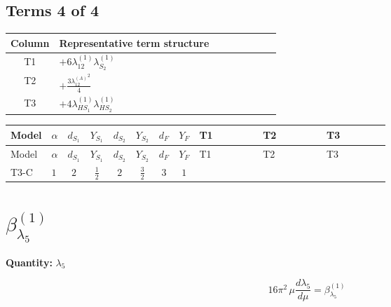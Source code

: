 \documentclass[8pt]{article}
\begin{document}
\begin{landscape}
\subsection*{Terms 4 of 4}
\begin{center}
\begin{tabular}{@{}c >{\raggedright\arraybackslash}p{0.82\linewidth}@{}}
\toprule
Column & Representative term structure \\
\midrule
T1 & \(\displaystyle +6 {\lambda_{12}^{(1)}} {\lambda_{S_2}^{(1)}}\) \\
\midrule
T2 & \(\displaystyle +\frac{3 {\lambda_{12}^{(A)}}^2}{4}\) \\
\midrule
T3 & \(\displaystyle +4 {\lambda_{HS_1}^{(1)}} {\lambda_{HS_2}^{(1)}}\) \\
\midrule
\bottomrule
\end{tabular}
\end{center}
\smallskip
\tiny
\begin{longtable}{@{}llcccccc >{\raggedright\arraybackslash}p{0.21\linewidth} >{\raggedright\arraybackslash}p{0.21\linewidth} >{\raggedright\arraybackslash}p{0.21\linewidth}@{}}
\toprule
Model & $\alpha$ & $d_{S_1}$ & $Y_{S_1}$ & $d_{S_2}$ & $Y_{S_2}$ & $d_F$ & $Y_F$ & T1 & T2 & T3 \\
\midrule
\endfirsthead
\toprule
Model & $\alpha$ & $d_{S_1}$ & $Y_{S_1}$ & $d_{S_2}$ & $Y_{S_2}$ & $d_F$ & $Y_F$ & T1 & T2 & T3 \\
\midrule
\endhead
T3-C & $1$ & $2$ & $\frac{1}{2}$ & $2$ & $\frac{3}{2}$ & $3$ & $1$ & \scriptsize\adjustbox{max width=\linewidth}{$\begin{gathered} +6 {\lambda_{12}^{(1)}} {\lambda_{S_2}^{(1)}}\end{gathered}$} & \scriptsize\adjustbox{max width=\linewidth}{$\begin{gathered} +\frac{3 {\lambda_{12}^{(A)}}^2}{4}\end{gathered}$} & \scriptsize\adjustbox{max width=\linewidth}{$\begin{gathered} +4 {\lambda_{HS_1}^{(1)}} {\lambda_{HS_2}^{(1)}}\end{gathered}$} \\
\midrule
\bottomrule
\end{longtable}
\clearpage
\section*{$\beta_{\lambda_5}^{(1)}$}
\noindent\textbf{Quantity: }$\lambda_5$\par\smallskip
\[16\pi^2\,\mu\frac{d \lambda_5}{d\mu}=\beta_{\lambda_5}^{(1)}\]

\end{landscape}
\end{document}
